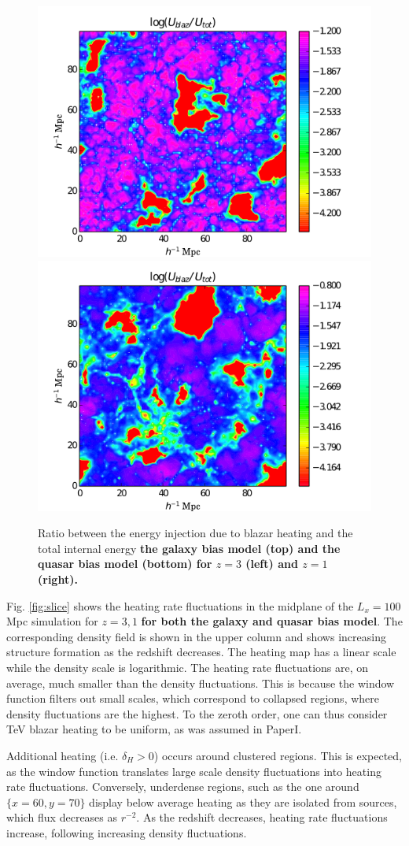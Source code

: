 \documentclass[twocolumns]{emulateapj}
\newcommand\ALc[1]{{\color{red} \bf #1}} %
\begin{document}
{\begin{figure}
  \includegraphics[width = .45\textwidth ]{data_U_z3_qso4.png}
  \includegraphics[width = .45\textwidth ]{data_U_z1_qso4.png}
   \caption{Ratio between the energy injection due to blazar heating and the total internal energy \ALc{the galaxy bias model (top) and the quasar bias model (bottom) for $z=3$ (left) and $z=1$ (right).}}
  \label{fig:heating_ratio}
\end{figure}


Fig. \ref{fig:slice} shows the heating rate fluctuations in the midplane of the $L_x=100$ Mpc simulation for $z=3,1$ \ALc{for both the galaxy and quasar bias model}.  The corresponding density field is shown in the upper column and shows increasing structure formation as the redshift decreases.  The heating map has a linear scale while the density scale is logarithmic. The heating rate fluctuations are, on average, much smaller than the density fluctuations. This is because the window function filters out small scales, which correspond to collapsed regions,  where density fluctuations are the highest. To the zeroth order, one can thus consider TeV blazar heating to be uniform, as was assumed in PaperI.



Additional heating (i.e. $\delta_H>0$) occurs around clustered regions. This is expected, as the window function translates large scale density fluctuations into heating rate fluctuations.  Conversely, underdense regions, such as the one around $\{x=60,y=70\}$ display below average heating as they are isolated from sources, which flux decreases as $r^{-2}$. As the redshift decreases, heating rate fluctuations increase, following increasing density fluctuations.

}
\end{document}
